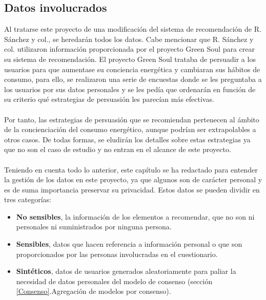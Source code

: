 \subsection{Datos involucrados}
Al tratarse este proyecto de una modificación del sistema de recomendación de R. Sánchez y col., se heredarán todos los datos. Cabe mencionar que R. Sánchez y col. utilizaron información proporcionada por el proyecto Green Soul\autocite{EcoawarePersuasiveNetworked} para crear su sistema de recomendación. El proyecto Green Soul trataba de persuadir a los usuarios para que aumentase su conciencia energética y cambiaran sus hábitos de consumo, para ello, se realizaron una serie de encuestas donde se les preguntaba a los usuarios por sus datos personales y se les pedía que ordenarán en función de su criterio qué estrategias de persuasión les parecían más efectivas.
\\ \\
Por tanto, las estrategias de persuasión que se recomiendan pertenecen al ámbito de la concienciación del consumo energético, aunque podrían ser extrapolables a otros casos. De todas formas, se eludirán los detalles sobre estas estrategias ya que no son el caso de estudio y no entran en el alcance de este proyecto.
\\ \\
Teniendo en cuenta todo lo anterior, este capítulo se ha redactado para entender la gestión de los datos en este proyecto, ya que algunos son de carácter personal y es de suma importancia preservar su privacidad. Estos datos se pueden dividir en tres categorías:
\begin{itemize}
    \item \textbf{No sensibles}, la información de los elementos a recomendar, que no son ni personales ni suministrados por ninguna persona.
    \item  \textbf{Sensibles}, datos que hacen referencia a información personal o que son proporcionados por las personas involucradas en el cuestionario.
    \item \textbf{Sintéticos}, datos de usuarios generados aleatoriamente para paliar la necesidad de datos personales del modelo de consenso (sección \ref{Consenso}.Agregación de modelos por consenso).
\end{itemize} 

